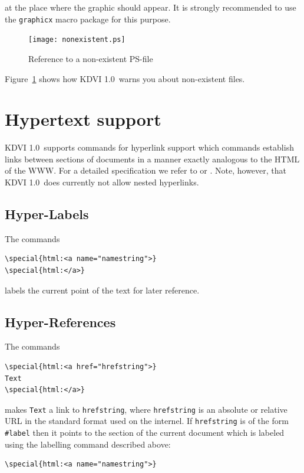 \documentclass{article}
\newcommand{\KDVI}{{\sf KDVI 1.0}}
\begin{document}
at the place where the graphic should appear. It is strongly
recommended to use the {\tt graphicx} macro package for this purpose.
\begin{figure}
  \begin{center}
    \texttt{[image: nonexistent.ps]}
  \end{center}
\caption{Reference to a non-existent PS-file\label{nonex-special}}
\end{figure}
Figure~\ref{nonex-special} shows how \KDVI\ warns you about
non-existent files.


\section{Hypertext support}

\KDVI\ supports commands for hyperlink support which commands
establish links between sections of documents in a manner exactly
analogous to the HTML of the WWW. For a detailed specification we
refer to \cite{HFAQ99} or \cite{Rah98}. Note, however, that \KDVI\ 
does currently not allow nested hyperlinks.

\subsection{Hyper-Labels}

The commands
\begin{verbatim}
\special{html:<a name="namestring">}
\special{html:</a>}
\end{verbatim}
labels the current point of the text for later reference.

\subsection{Hyper-References}

The commands 
\begin{verbatim}
\special{html:<a href="hrefstring">}
Text
\special{html:</a>}
\end{verbatim}
makes {\tt Text} a link to {\tt hrefstring}, where {\tt hrefstring} is
an absolute or relative URL in the standard format used on the
internel. If {\tt hrefstring} is of the form {\tt \#label} then it
points to the section of the current document which is labeled using
the labelling command described above:
\begin{verbatim}
\special{html:<a name="namestring">}
\end{verbatim}
\end{document}
